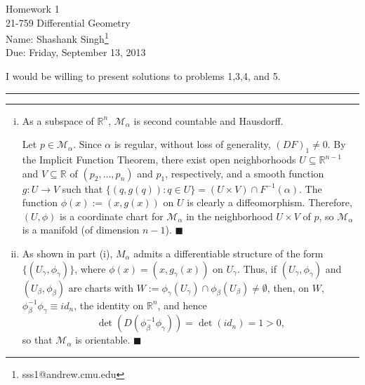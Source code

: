 \documentclass[11pt]{article}
\makeatletter
\newcounter{questionCounter}
\newcounter{partCounter}[questionCounter]
\newenvironment{question}[2][\arabic{questionCounter}]{%
    \setcounter{partCounter}{0}%
    \vspace{.25in} \hrule \vspace{0.5em}%
        \noindent{\bf #2}%
    \vspace{0.8em} \hrule \vspace{.10in}%
    \addtocounter{questionCounter}{1}%
}{}
\newcommand{\myname}{Shashank Singh}
\newcommand{\myandrew}{sss1@andrew.cmu.edu}
\newcommand{\myclass}{21-759 Differential Geometry}
\newcommand{\myhwnum}{1}
\newcommand{\duedate}{Friday, September 13, 2013}
\renewcommand{\qed}{\quad \ensuremath{\blacksquare}}    %
\newcommand{\inv}{^{-1}}                %
\renewcommand{\det}{\operatorname{det}} %
\newcommand{\R}{\mathbb{R}}             %
\newcommand{\M}{\mathcal{M}}            %
\makeatother
\begin{document}
\thispagestyle{plain}

{\Large Homework \myhwnum} \\
\myclass \\
Name: \myname\footnote{\myandrew} \\
Due: \duedate

I would be willing to present solutions to problems 1,3,4, and 5.

\begin{question}{Problem 1}
\begin{enumerate}[(i)]
\item As a subspace of $\R^n$, $\M_\alpha$ is second countable and Hausdorff.

Let $p \in \M_\alpha$. Since $\alpha$ is regular, without loss of generality,
$(DF)_1 \neq 0$. By the Implicit Function Theorem, there exist open
neighborhoods $U \subseteq \R^{n - 1}$ and $V \subseteq \R$ of
$(p_2,\dots,p_n)$ and $p_1$, respectively, and a smooth function $g : U \to V$
such that $\{(q,g(q)) : q \in U\} = (U \times V) \cap F\inv(\alpha)$. The
function $\phi(x) := (x,g(x))$ on $U$ is clearly a diffeomorphism. Therefore,
$(U, \phi)$ is a coordinate chart for $\M_\alpha$ in the neighborhood
$U \times V$ of $p$, so $\M_\alpha$ is a manifold (of dimension $n-1$). \qed


\item As shown in part (i),  $M_\alpha$ admits a differentiable structure
of the form $\{(U_\gamma,\phi_\gamma)\}$, where $\phi(x) = (x,g_\gamma(x))$ on
$U_\gamma$. Thus, if $(U_\gamma,\phi_\gamma)$ and $(U_\beta,\phi_\beta)$ are
charts with
$W := \phi_\gamma(U_\gamma) \cap \phi_\beta(U_\beta) \neq \emptyset$, then, on
$W$, $\phi_\beta\inv\phi_\gamma \equiv id_n$, the identity on $\R^n$, and hence
\[\det(D(\phi_\beta\inv\phi_\gamma)) = \det(id_n) = 1 > 0,\] so that
$\M_\alpha$ is orientable. \qed
\end{enumerate}
\end{question}
\end{document}
